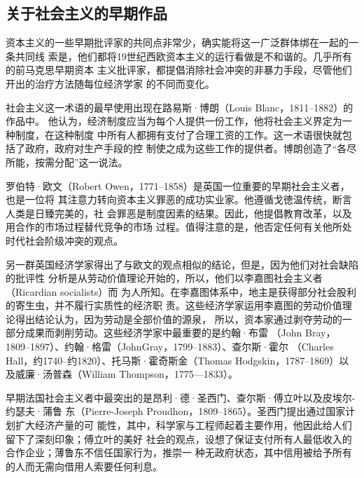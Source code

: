 \subsection{关于社会主义的早期作品}

资本主义的一些早期批评家的共同点非常少，确实能将这一广泛群体绑在一起的一条共同线
索是，他们都将19世纪西欧资本主义的运行看做是不和谐的。几乎所有的前马克思早期资本
主义批评家，都提倡消除社会冲突的非暴力手段，尽管他们开出的治疗方法随每位经济学家
的不同而变化。

社会主义这一术语的最早使用出现在路易斯·博朗（Louis Blanc，1811--1882）的作品中。
他认为，经济制度应当为每个人提供一份工作，他将社会主义界定为一种制度，在这种制度
中所有人都拥有支付了合理工资的工作。这一术语很快就包括了政府，政府对生产手段的控
制使之成为这些工作的提供者。博朗创造了“各尽所能，按需分配”这一说法。

罗伯特·欧文（Robert Owen，1771--1858）是英国一位重要的早期社会主义者，也是一位将
其注意力转向资本主义罪恶的成功实业家。他遵循戈徳温传统，断言人类是日臻完美的，社
会罪恶是制度因素的结果。因此，他提倡教育改革，以及用合作的市场过程替代竞争的市场
过程。值得注意的是，他否定任何有关他所处时代社会阶级冲突的观点。

另一群英国经济学家得出了与欧文的观点相似的结论，但是，因为他们对社会缺陷的批评性
分析是从劳动价值理论开始的，所以，他们以李嘉图社会主义者（Ricardian socialists）而
为人所知。在李嘉图体系中，地主是获得部分社会股利的寄生虫，并不履行实质性的经济职
责。这些经济学家运用李嘉图的劳动价值理论得出结论认为，因为劳动是全部价值的源泉，
所以，资本家通过剥夺劳动的一部分成果而剥削劳动。这些经济学家中最重要的是约翰·布雷
（John Bray，1809--1897）、约翰·格雷（JohnGray，1799--1883）、查尔斯·霍尔
（Charles Hall，约1740--约1820）、托马斯·霍奇斯金（Thomas Hodgskin，1787--1869）以
及威廉·汤普森（William Thompson，1775—1833）。

早期法国社会主义者中最突出的是昂利·德·圣西门、查尔斯·傅立叶以及皮埃尔-约瑟夫·蒲鲁
东（Pierre-Joseph Proudhon，1809--1865）。圣西门提出通过国家计划扩大经济产量的可
能性，其中，科学家与工程师起着主要作用，他因此给人们留下了深刻印象；傅立叶的美好
社会的观点，设想了保证支付所有人最低收入的合作企业；薄鲁东不信任国家行为，推崇一
种无政府状态，其中信用被给予所有的人而无需向借用人索要任何利息。

